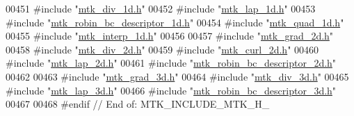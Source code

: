 \begin{DoxyCode}
00451 \textcolor{preprocessor}{#include "\hyperlink{mtk__div__1d_8h}{mtk\_div\_1d.h}"}
00452 \textcolor{preprocessor}{#include "\hyperlink{mtk__lap__1d_8h}{mtk\_lap\_1d.h}"}
00453 \textcolor{preprocessor}{#include "\hyperlink{mtk__robin__bc__descriptor__1d_8h}{mtk\_robin\_bc\_descriptor\_1d.h}"}
00454 \textcolor{preprocessor}{#include "\hyperlink{mtk__quad__1d_8h}{mtk\_quad\_1d.h}"}
00455 \textcolor{preprocessor}{#include "\hyperlink{mtk__interp__1d_8h}{mtk\_interp\_1d.h}"}
00456 
00457 \textcolor{preprocessor}{#include "\hyperlink{mtk__grad__2d_8h}{mtk\_grad\_2d.h}"}
00458 \textcolor{preprocessor}{#include "\hyperlink{mtk__div__2d_8h}{mtk\_div\_2d.h}"}
00459 \textcolor{preprocessor}{#include "\hyperlink{mtk__curl__2d_8h}{mtk\_curl\_2d.h}"}
00460 \textcolor{preprocessor}{#include "\hyperlink{mtk__lap__2d_8h}{mtk\_lap\_2d.h}"}
00461 \textcolor{preprocessor}{#include "\hyperlink{mtk__robin__bc__descriptor__2d_8h}{mtk\_robin\_bc\_descriptor\_2d.h}"}
00462 
00463 \textcolor{preprocessor}{#include "\hyperlink{mtk__grad__3d_8h}{mtk\_grad\_3d.h}"}
00464 \textcolor{preprocessor}{#include "\hyperlink{mtk__div__3d_8h}{mtk\_div\_3d.h}"}
00465 \textcolor{preprocessor}{#include "\hyperlink{mtk__lap__3d_8h}{mtk\_lap\_3d.h}"}
00466 \textcolor{preprocessor}{#include "\hyperlink{mtk__robin__bc__descriptor__3d_8h}{mtk\_robin\_bc\_descriptor\_3d.h}"}
00467 
00468 \textcolor{preprocessor}{#endif // End of: MTK\_INCLUDE\_MTK\_H\_}
\end{DoxyCode}
